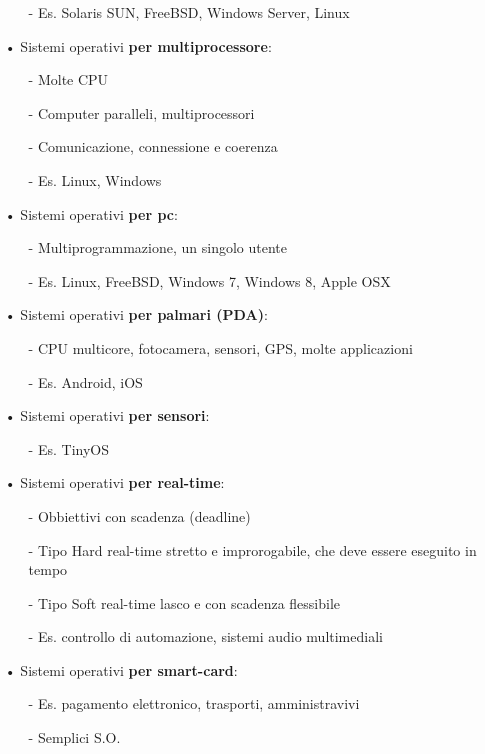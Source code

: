 \documentclass[12pt, letterpaper]{article}
\begin{document}
\begin{itemize}
\begin{itemize}
         \item[-] Es. Solaris SUN, FreeBSD, Windows Server, Linux
      \end{itemize}
   \item[•] Sistemi operativi \textbf{per multiprocessore}:
      \begin{itemize}
         \item[-] Molte CPU
         \item[-] Computer paralleli, multiprocessori
         \item[-] Comunicazione, connessione e coerenza
         \item[-] Es. Linux, Windows
      \end{itemize}
   \item[•] Sistemi operativi \textbf{per pc}:
      \begin{itemize}
         \item[-] Multiprogrammazione, un singolo utente
         \item[-] Es. Linux, FreeBSD, Windows 7, Windows 8, Apple OSX
      \end{itemize}
   \item[•] Sistemi operativi \textbf{per palmari (PDA)}:
      \begin{itemize}
         \item[-] CPU multicore, fotocamera, sensori, GPS, molte applicazioni 
         \item[-] Es. Android, iOS
      \end{itemize}
   \item[•] Sistemi operativi \textbf{per sensori}:
      \begin{itemize}
         \item[-] Es. TinyOS
      \end{itemize}
   \item[•] Sistemi operativi \textbf{per real-time}:
      \begin{itemize}
         \item[-] Obbiettivi con scadenza (deadline)
         \item[-] Tipo Hard real-time stretto e improrogabile, che deve essere eseguito in tempo
         \item[-] Tipo Soft real-time lasco e con scadenza flessibile 
         \item[-] Es. controllo di automazione, sistemi audio multimediali 
      \end{itemize}
   \item[•] Sistemi operativi \textbf{per smart-card}:
      \begin{itemize}
         \item[-] Es. pagamento elettronico, trasporti, amministravivi
         \item[-] Semplici S.O.
      \end{itemize}
\end{itemize}
\end{document}
